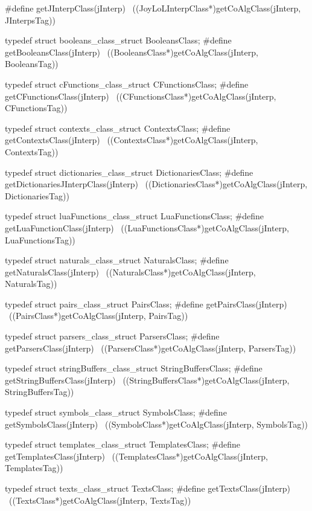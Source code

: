 #define getJInterpClass(jInterp)                            \
  ((JoyLoLInterpClass*)getCoAlgClass(jInterp, JInterpsTag))

typedef struct booleans_class_struct BooleansClass;
#define getBooleansClass(jInterp)                           \
  ((BooleansClass*)getCoAlgClass(jInterp, BooleansTag))

typedef struct cFunctions_class_struct CFunctionsClass;
#define getCFunctionsClass(jInterp)                         \
  ((CFunctionsClass*)getCoAlgClass(jInterp, CFunctionsTag))

typedef struct contexts_class_struct ContextsClass;
#define getContextsClass(jInterp)                           \
  ((ContextsClass*)getCoAlgClass(jInterp, ContextsTag))

typedef struct dictionaries_class_struct DictionariesClass;
#define getDictionariesJInterpClass(jInterp)                \
  ((DictionariesClass*)getCoAlgClass(jInterp, DictionariesTag))

typedef struct luaFunctions_class_struct LuaFunctionsClass;
#define getLuaFunctionClass(jInterp)                        \
  ((LuaFunctionsClass*)getCoAlgClass(jInterp, LuaFunctionsTag))

typedef struct naturals_class_struct NaturalsClass;
#define getNaturalsClass(jInterp)                           \
  ((NaturalsClass*)getCoAlgClass(jInterp, NaturalsTag))

typedef struct pairs_class_struct PairsClass;
#define getPairsClass(jInterp)                              \
  ((PairsClass*)getCoAlgClass(jInterp, PairsTag))

typedef struct parsers_class_struct ParsersClass;
#define getParsersClass(jInterp)                            \
  ((ParsersClass*)getCoAlgClass(jInterp, ParsersTag))

typedef struct stringBuffers_class_struct StringBuffersClass;
#define getStringBuffersClass(jInterp)                      \
  ((StringBuffersClass*)getCoAlgClass(jInterp, StringBuffersTag))

typedef struct symbols_class_struct SymbolsClass;
#define getSymbolsClass(jInterp)                            \
  ((SymbolsClass*)getCoAlgClass(jInterp, SymbolsTag))
  
typedef struct templates_class_struct TemplatesClass;
#define getTemplatesClass(jInterp)                          \
  ((TemplatesClass*)getCoAlgClass(jInterp, TemplatesTag))

typedef struct texts_class_struct TextsClass;
#define getTextsClass(jInterp)                              \
  ((TextsClass*)getCoAlgClass(jInterp, TextsTag))
\stopCHeader


